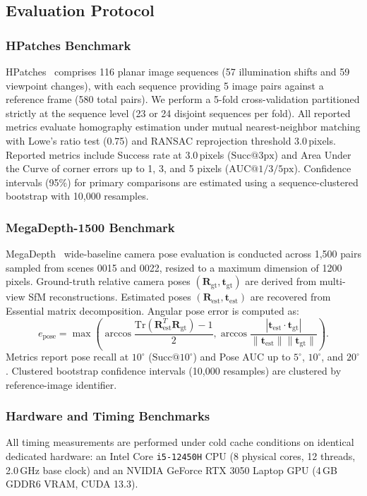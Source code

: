 \documentclass[conference]{IEEEtran}
\begin{document}
\subsection{Evaluation Protocol}
\subsubsection{HPatches Benchmark}
HPatches~\cite{balntas2017hpatches} comprises 116 planar image sequences (57 illumination shifts and 59 viewpoint changes), with each sequence providing 5 image pairs against a reference frame (580 total pairs). We perform a 5-fold cross-validation partitioned strictly at the sequence level (23 or 24 disjoint sequences per fold). All reported metrics evaluate homography estimation under mutual nearest-neighbor matching with Lowe's ratio test (0.75) and RANSAC reprojection threshold 3.0\,pixels. Reported metrics include Success rate at 3.0\,pixels ($\text{Succ}@3\text{px}$) and Area Under the Curve of corner errors up to 1, 3, and 5 pixels ($\text{AUC}@1/3/5\text{px}$). Confidence intervals (95\%) for primary comparisons are estimated using a sequence-clustered bootstrap with 10,000 resamples.

\subsubsection{MegaDepth-1500 Benchmark}
MegaDepth~\cite{li2018megadepth} wide-baseline camera pose evaluation is conducted across 1,500 pairs sampled from scenes 0015 and 0022, resized to a maximum dimension of 1200 pixels. Ground-truth relative camera poses $(\mathbf{R}_{\text{gt}}, \mathbf{t}_{\text{gt}})$ are derived from multi-view SfM reconstructions. Estimated poses $(\mathbf{R}_{\text{est}}, \mathbf{t}_{\text{est}})$ are recovered from Essential matrix decomposition. Angular pose error is computed as:
\begin{equation}
e_{\text{pose}} = \max\left(\arccos\frac{\mathrm{Tr}(\mathbf{R}_{\text{est}}^T \mathbf{R}_{\text{gt}}) - 1}{2}, \arccos\frac{|\mathbf{t}_{\text{est}} \cdot \mathbf{t}_{\text{gt}}|}{\|\mathbf{t}_{\text{est}}\| \|\mathbf{t}_{\text{gt}}\|}\right).
\end{equation}
Metrics report pose recall at $10^\circ$ ($\text{Succ}@10^\circ$) and Pose AUC up to $5^\circ$, $10^\circ$, and $20^\circ$. Clustered bootstrap confidence intervals (10,000 resamples) are clustered by reference-image identifier.

\subsubsection{Hardware and Timing Benchmarks}
All timing measurements are performed under cold cache conditions on identical dedicated hardware: an Intel Core \texttt{i5-12450H} CPU (8 physical cores, 12 threads, 2.0\,GHz base clock) and an NVIDIA GeForce RTX 3050 Laptop GPU (4\,GB GDDR6 VRAM, CUDA 13.3).
\end{document}
